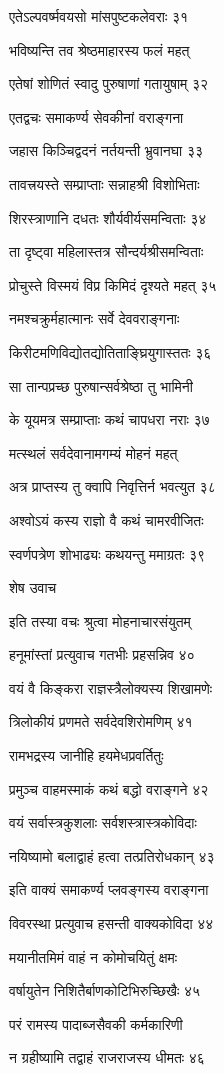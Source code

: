 एतेऽल्पवर्ष्मवयसो मांसपुष्टकलेवराः ३१

भविष्यन्ति तव श्रेष्ठमाहारस्य फलं महत्

एतेषां शोणितं स्वादु पुरुषाणां गतायुषाम् ३२

एतद्वचः समाकर्ण्य सेवकीनां वराङ्गना

जहास किञ्चिद्वदनं नर्तयन्ती भ्रुवानघा ३३

तावत्त्रयस्ते सम्प्राप्ताः सन्नाहश्री विशोभिताः

शिरस्त्राणानि दधतः शौर्यवीर्यसमन्विताः ३४

ता दृष्ट्वा महिलास्तत्र सौन्दर्यश्रीसमन्विताः

प्रोचुस्ते विस्मयं विप्र किमिदं दृश्यते महत् ३५

नमश्चक्रुर्महात्मानः सर्वे देववराङ्गनाः

किरीटमणिविद्योतद्योतिताङ्घ्रियुगास्ततः ३६

सा तान्पप्रच्छ पुरुषान्सर्वश्रेष्ठा तु भामिनी

के यूयमत्र सम्प्राप्ताः कथं चापधरा नराः ३७

मत्स्थलं सर्वदेवानामगम्यं मोहनं महत्

अत्र प्राप्तस्य तु क्वापि निवृत्तिर्न भवत्युत ३८

अश्वोऽयं कस्य राज्ञो वै कथं चामरवीजितः

स्वर्णपत्रेण शोभाढ्यः कथयन्तु ममाग्रतः ३९

शेष उवाच

इति तस्या वचः श्रुत्वा मोहनाचारसंयुतम्

हनूमांस्तां प्रत्युवाच गतभीः प्रहसन्निव ४०

वयं वै किङ्करा राज्ञस्त्रैलोक्यस्य शिखामणेः

त्रिलोकीयं प्रणमते सर्वदेवशिरोमणिम् ४१

रामभद्रस्य जानीहि हयमेधप्रवर्तितुः

प्रमुञ्च वाहमस्माकं कथं बद्धो वराङ्गने ४२

वयं सर्वास्त्रकुशलाः सर्वशस्त्रास्त्रकोविदाः

नयिष्यामो बलाद्वाहं हत्वा तत्प्रतिरोधकान् ४३

इति वाक्यं समाकर्ण्य प्लवङ्गस्य वराङ्गना

विवरस्था प्रत्युवाच हसन्ती वाक्यकोविदा ४४

मयानीतमिमं वाहं न कोमोचयितुं क्षमः

वर्षायुतेन निशितैर्बाणकोटिभिरुच्छिखैः ४५

परं रामस्य पादाब्जसैवकी कर्मकारिणी

न ग्रहीष्यामि तद्वाहं राजराजस्य धीमतः ४६

